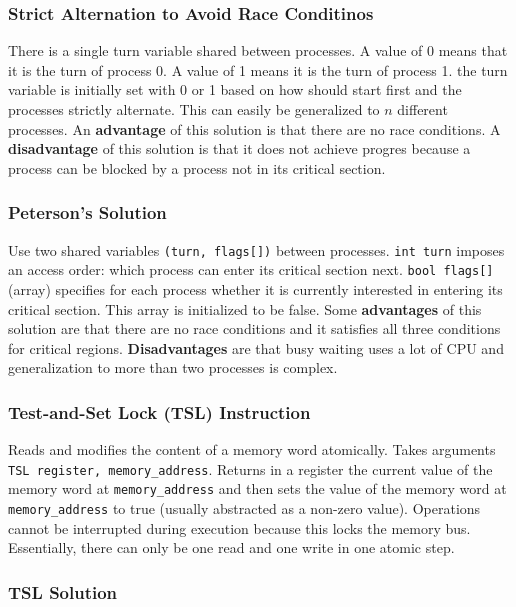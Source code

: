 \documentclass{article}
\newcommand{\bold}[1]{\textbf{#1}}
\begin{document}
    \subsubsection{Strict Alternation to Avoid Race Conditinos}

    There is a single turn variable shared between processes. A value of 0 means that it is the turn of process 0. A value of 1 means it is the turn of process 1. the turn variable is initially set with 0 or 1 based on how should start first and the processes strictly alternate. This can easily be generalized to $n$ different processes. An \bold{advantage} of this solution is that there are no race conditions. A \bold{disadvantage} of this solution is that it does not achieve progres because a process can be blocked by a process not in its critical section.

    \subsubsection{Peterson's Solution}

    Use two shared variables \texttt{(turn, flags[])} between processes. \texttt{int turn} imposes an access order: which process can enter its critical section next. \texttt{bool flags[]} (array) specifies for each process whether it is currently interested in entering its critical section. This array is initialized to be false. Some \bold{advantages} of this solution are that there are no race conditions and it satisfies all three conditions for critical regions. \bold{Disadvantages} are that busy waiting uses a lot of CPU and generalization to more than two processes is complex. 

    \subsubsection{Test-and-Set Lock (TSL) Instruction}

    Reads and modifies the content of a memory word atomically. Takes arguments \texttt{TSL register, memory\_address}. Returns in a register the current value of the memory word at \texttt{memory\_address} and then sets the value of the memory word at \texttt{memory\_address} to true (usually abstracted as a non-zero value). Operations cannot be interrupted during execution because this locks the memory bus. Essentially, there can only be one read and one write in one atomic step. 

    \subsubsection{TSL Solution}
\end{document}
